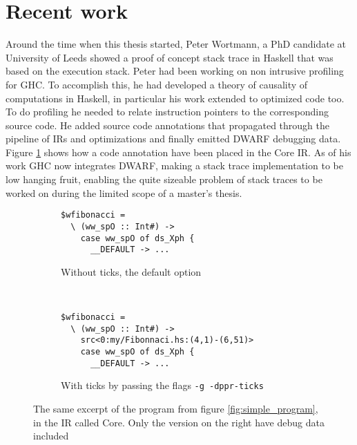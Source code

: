 \section{Recent work} \label{sec:recent_work}

Around the time when this thesis started, Peter Wortmann, a
PhD candidate at University of Leeds showed a proof of concept
stack trace in Haskell that was based on the execution stack.
\cite{stack_traces_ticket} Peter had been working on non intrusive
profiling for GHC. To accomplish this, he had developed a theory of
causality of computations in Haskell, in particular his work extended to
optimized code too. \cite{DBLP:conf/haskell/WortmannD13} To do profiling
he needed to relate instruction pointers to the corresponding source
code. He added source code annotations that propagated
through the pipeline of IRs and optimizations and finally emitted DWARF
debugging data. Figure \ref{fig:core_and_ticks} shows how a code annotation have been placed in the Core IR. As of his work GHC now integrates DWARF, making a
stack trace implementation to be low hanging fruit, enabling the quite
sizeable problem of stack traces to be worked on during the limited
scope of a master's thesis.

\begin{figure}
\begin{mdframed}
        \begin{subfigure}[t]{0.4\textwidth}
            \begin{verbatim}
$wfibonacci =
  \ (ww_spO :: Int#) ->
    case ww_spO of ds_Xph {
      __DEFAULT -> ...
            \end{verbatim}
            \caption{Without ticks, the default option}
        \end{subfigure}
        ~ %
        \begin{subfigure}[t]{0.6\textwidth}
          \begin{verbatim}
$wfibonacci =
  \ (ww_spO :: Int#) ->
    src<0:my/Fibonnaci.hs:(4,1)-(6,51)>
    case ww_spO of ds_Xph {
      __DEFAULT -> ...
          \end{verbatim}
          \caption{With ticks by passing the flags \texttt{-g -dppr-ticks}}
        \end{subfigure}
        \caption{The same excerpt of the program from figure
\ref{fig:simple_program}, in the IR called Core. Only the version on the
right have debug data included }\label{fig:core_and_ticks}
\end{mdframed}
\end{figure}

